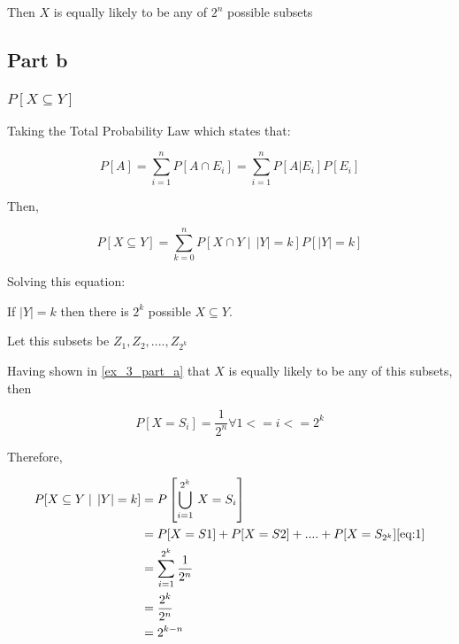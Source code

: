 \documentclass[12pt, a4paper]{article}
\begin{document}
Then $X$ is equally likely to be any of $2^n$ possible subsets

\subsection{Part b}
\subsubsection{\(P[X \subseteq Y]\)}

Taking the Total Probability Law which states that:

\begin{center}
  \begin{displaymath}
    P[A] = \displaystyle\sum_{i=1}^{n} P[A \cap E_i] = \displaystyle\sum_{i=1}^{n} P[A|E_i]P[E_i]
  \end{displaymath}
\end{center}

Then,

\begin{center}
  \begin{displaymath}
    P[X \subseteq Y] = \displaystyle\sum_{k=0}^{n} P[X \cap Y \mid\, |Y|=k]P[|Y|=k]
  \end{displaymath}
\end{center}

Solving this equation:

If $|Y| = k$ then there is $2^k$ possible $X \subseteq Y$.

Let this subsets be $Z_1, Z_2,...., Z_{2^k}$

Having shown in \ref{ex_3_part_a} that $X$ is equally likely to be any of this
subsets, then

\begin{equation}
  \label{eq:1}
  P[X=S_i] = \frac{1}{2^n} \forall 1 <= i <= 2^k
\end{equation}

Therefore,

\begin{subequations}
  \begin{align}
  P[X \subseteq Y \mid\, |Y| = k] &= P\left[\bigcup_{i=1}^{2^k} \, X = S_i\right] \\
                                  &= P[X=S1] + P[X=S2] + .... + P[X = S_{2^k}] \eqref{eq:1}\\  
                                  &= \displaystyle\sum_{i=1}^{2^k} \frac{1}{2^n} \\
                                  &= \frac{2^k}{2^n} \\
                                  &= 2^{k-n} \label{eq:2}
  \end{align}
\end{subequations}
\end{document}

